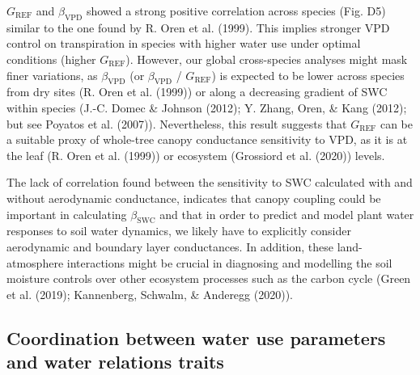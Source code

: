\documentclass[11pt,twoside]{reedthesis}
\begin{document}
\(G_{\text{REF}}\) and \(\beta_{\text{VPD}}\) showed a strong positive
correlation across species (Fig. D5) similar to the one found by R. Oren
et al. (1999). This implies stronger VPD control on transpiration in
species with higher water use under optimal conditions (higher
\(G_{\text{REF}}\)). However, our global cross-species analyses might
mask finer variations, as \(\beta_{\text{VPD}}\) (or
\(\beta_{\text{VPD}}\) / \(G_{\text{REF}}\)) is expected to be lower
across species from dry sites (R. Oren et al. (1999)) or along a
decreasing gradient of SWC within species (J.-C. Domec \& Johnson
(2012); Y. Zhang, Oren, \& Kang (2012); but see Poyatos et al. (2007)).
Nevertheless, this result suggests that \(G_{\text{REF}}\) can be a
suitable proxy of whole-tree canopy conductance sensitivity to VPD, as
it is at the leaf (R. Oren et al. (1999)) or ecosystem (Grossiord et al.
(2020)) levels.\par

The lack of correlation found between the sensitivity to SWC calculated
with and without aerodynamic conductance, indicates that canopy coupling
could be important in calculating \(\beta_{\text{SWC}}\) and that in
order to predict and model plant water responses to soil water dynamics,
we likely have to explicitly consider aerodynamic and boundary layer
conductances. In addition, these land-atmosphere interactions might be
crucial in diagnosing and modelling the soil moisture controls over
other ecosystem processes such as the carbon cycle (Green et al. (2019);
Kannenberg, Schwalm, \& Anderegg (2020)).\par

\subsection{Coordination between water use parameters and water
relations
traits}\label{coordination-between-water-use-parameters-and-water-relations-traits}
\end{document}

